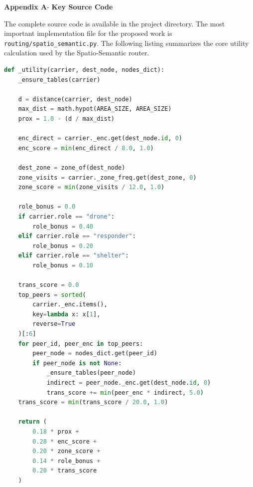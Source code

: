\begin{center}
	{\Large \textbf{Appendix A}}-\vspace*{0.5 cm}
	{\Large \textbf{Key Source Code}}
	
\end{center}

The complete source code is available in the project directory. The most important implementation file for the proposed work is \verb|routing/spatio_semantic.py|. The following listing summarizes the core utility calculation used by the Spatio-Semantic router.

\begin{lstlisting}[language=Python]
def _utility(carrier, dest_node, nodes_dict):
    _ensure_tables(carrier)

    d = distance(carrier, dest_node)
    max_dist = math.hypot(AREA_SIZE, AREA_SIZE)
    prox = 1.0 - (d / max_dist)

    enc_direct = carrier._enc.get(dest_node.id, 0)
    enc_score = min(enc_direct / 8.0, 1.0)

    dest_zone = zone_of(dest_node)
    zone_visits = carrier._zone_freq.get(dest_zone, 0)
    zone_score = min(zone_visits / 12.0, 1.0)

    role_bonus = 0.0
    if carrier.role == "drone":
        role_bonus = 0.40
    elif carrier.role == "responder":
        role_bonus = 0.20
    elif carrier.role == "shelter":
        role_bonus = 0.10

    trans_score = 0.0
    top_peers = sorted(
        carrier._enc.items(),
        key=lambda x: x[1],
        reverse=True
    )[:6]
    for peer_id, peer_enc in top_peers:
        peer_node = nodes_dict.get(peer_id)
        if peer_node is not None:
            _ensure_tables(peer_node)
            indirect = peer_node._enc.get(dest_node.id, 0)
            trans_score += min(peer_enc * indirect, 5.0)
    trans_score = min(trans_score / 20.0, 1.0)

    return (
        0.18 * prox +
        0.28 * enc_score +
        0.20 * zone_score +
        0.14 * role_bonus +
        0.20 * trans_score
    )
\end{lstlisting}
